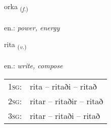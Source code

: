 \documentclass[frontgrid, backgrid]{flacards}\usepackage[]{graphicx}\usepackage[]{xcolor}
\begin{document}
\renewcommand{\flhead}{\vskip5pt \fboxsep=0pt {\small\bfseries\footnotesize Nafnorð | Noun}}
\renewcommand{\fcfoot}{\vskip5pt \fboxsep=0pt \hspace{2pt}{\small\bfseries\footnotesize 2K}}

\renewcommand{\blhead}{\vskip5pt {\small\bfseries\footnotesize Nafnorð | Noun }}
\renewcommand{\bcfoot}{\vskip5pt \hspace{2pt}{\small\bfseries\footnotesize 2K}}


{orka \small{\textsubscript{(\textit{f.})}} \\[1ex] %
\textphonetic{[ɔr̥ka]} \\
en.: \emph{power, energy} \\  [2ex]
\renewcommand*{\arraystretch}{0.8}
}

\renewcommand{\flhead}{\vskip5pt \fboxsep=0pt {\small\bfseries\footnotesize Sagnorð | Verb}}
\renewcommand{\fcfoot}{\vskip5pt \fboxsep=0pt \hspace{2pt}{\small\bfseries\footnotesize 2K}}

\renewcommand{\blhead}{\vskip5pt {\small\bfseries\footnotesize Sagnorð | Verb }}
\renewcommand{\bcfoot}{\vskip5pt \hspace{2pt}{\small\bfseries\footnotesize 2K}}


{rita \small{\textsubscript{(\textit{v.})}} \\[1ex] %
\textphonetic{[rɪːta]} \\
en.: \emph{write, compose} \\  [2ex]
\renewcommand*{\arraystretch}{0.8}
\begin{tabular}{p{1cm}l}
\textsc{1sg}: & rita -- ritaði -- ritað \\ 
\textsc{2sg}: & ritar -- ritaðir -- ritað \\ 
\textsc{3sg}: & ritar -- ritaði -- ritað \\ 
\end{tabular}
}
\end{document}
